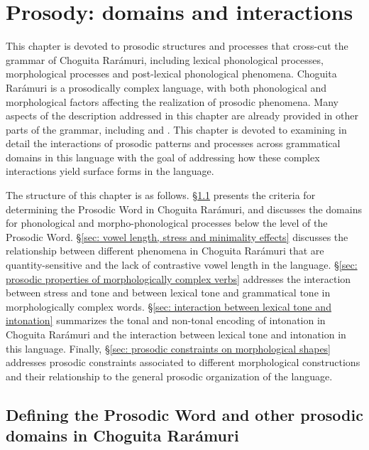 \chapter{Prosody: domains and interactions}
\label{chap: prosody}

This chapter is devoted to prosodic structures and processes that cross-cut the grammar of Choguita Rarámuri, including lexical phonological processes, morphological processes and post-lexical phonological phenomena. Choguita Rarámuri is a prosodically complex language, with both phonological and morphological factors affecting the realization of prosodic phenomena. Many aspects of the description addressed in this chapter are already provided in other parts of the grammar, including  and . This chapter is devoted to examining in detail the interactions of prosodic patterns and processes across grammatical domains in this  language with the goal of addressing how these complex interactions yield surface forms in the language.

The structure of this chapter is as follows. §\ref{sec: defining the prosodic word and other prosodic domains in CR} presents the criteria for determining the Prosodic Word in Choguita Rarámuri, and discusses the domains for phonological and morpho-phonological processes below the level of the Prosodic Word. §\ref{sec: vowel length, stress and minimality effects} discusses the relationship between different phenomena in Choguita Rarámuri that are quantity-sensitive and the lack of contrastive vowel length in the language. §\ref{sec: prosodic properties of morphologically complex verbs} addresses the interaction between stress and tone and between lexical tone and grammatical tone in morphologically complex words. §\ref{sec: interaction between lexical tone and intonation} summarizes the tonal and non-tonal encoding of intonation in Choguita Rarámuri and the interaction between lexical tone and intonation in this language. Finally, §\ref{sec: prosodic constraints on morphological shapes} addresses prosodic constraints associated to different morphological constructions and their relationship to the general prosodic organization of the language.

\section[Defining the Prosodic Word and other prosodic domains]{Defining the Prosodic Word and other prosodic domains in Choguita Rarámuri}
\label{sec: defining the prosodic word and other prosodic domains in CR}

